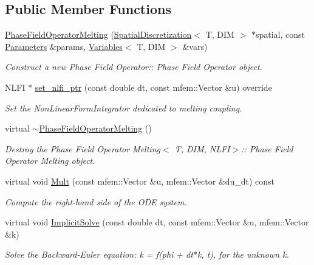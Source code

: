 \subsection*{Public Member Functions}
\begin{DoxyCompactItemize}
\item 
\hyperlink{classPhaseFieldOperatorMelting_af5647432ef045bf3afd99400640ec233}{Phase\+Field\+Operator\+Melting} (\hyperlink{classSpatialDiscretization}{Spatial\+Discretization}$<$ T, D\+IM $>$ $\ast$spatial, const \hyperlink{classParameters}{Parameters} \&params, \hyperlink{classVariables}{Variables}$<$ T, D\+IM $>$ \&vars)
\begin{DoxyCompactList}\small\item\em Construct a new Phase Field Operator\+:\+: Phase Field Operator object. \end{DoxyCompactList}\item 
N\+L\+FI $\ast$ \hyperlink{classPhaseFieldOperatorMelting_a0235f90bea5d33ab4567cf4ff9e3ce83}{set\+\_\+nlfi\+\_\+ptr} (const double dt, const mfem\+::\+Vector \&u) override
\begin{DoxyCompactList}\small\item\em Set the Non\+Linear\+Form\+Integrator dedicated to melting coupling. \end{DoxyCompactList}\item 
virtual \hyperlink{classPhaseFieldOperatorMelting_af2538e5e548c4dc24ffeb7262d3e8330}{$\sim$\+Phase\+Field\+Operator\+Melting} ()
\begin{DoxyCompactList}\small\item\em Destroy the Phase Field Operator Melting$<$ T,  D\+I\+M,  N\+L\+F\+I$>$\+:\+: Phase Field Operator Melting object. \end{DoxyCompactList}\item 
virtual void \hyperlink{classPhaseFieldOperatorBase_a55a314426a0d9bbb181cb5d35e8f76e9}{Mult} (const mfem\+::\+Vector \&u, mfem\+::\+Vector \&du\+\_\+dt) const
\begin{DoxyCompactList}\small\item\em Compute the right-\/hand side of the O\+DE system. \end{DoxyCompactList}\item 
virtual void \hyperlink{classPhaseFieldOperatorBase_ac1be84d201e35ba329090cdda6a4bfc5}{Implicit\+Solve} (const double dt, const mfem\+::\+Vector \&u, mfem\+::\+Vector \&k)
\begin{DoxyCompactList}\small\item\em Solve the Backward-\/\+Euler equation\+: k = f(phi + dt$\ast$k, t), for the unknown k. \end{DoxyCompactList}\item 

\end{DoxyCompactItemize}
